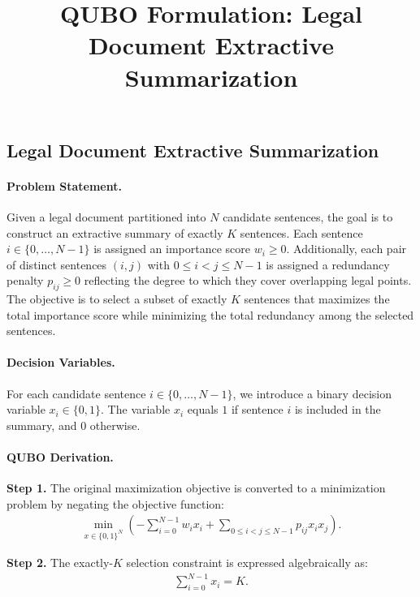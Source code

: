\documentclass[12pt]{article}
\title{QUBO Formulation: Legal Document Extractive Summarization}
\date{}
\begin{document}
\maketitle

\subsection*{Legal Document Extractive Summarization}

\paragraph{Problem Statement.}
Given a legal document partitioned into $N$ candidate sentences, the goal is to construct an extractive summary of exactly $K$ sentences. Each sentence $i \in \{0, \dots, N-1\}$ is assigned an importance score $w_i \geq 0$. Additionally, each pair of distinct sentences $(i, j)$ with $0 \leq i < j \leq N-1$ is assigned a redundancy penalty $p_{ij} \geq 0$ reflecting the degree to which they cover overlapping legal points. The objective is to select a subset of exactly $K$ sentences that maximizes the total importance score while minimizing the total redundancy among the selected sentences.

\paragraph{Decision Variables.}
For each candidate sentence $i \in \{0, \dots, N-1\}$, we introduce a binary decision variable $x_i \in \{0, 1\}$. The variable $x_i$ equals $1$ if sentence $i$ is included in the summary, and $0$ otherwise.

\paragraph{QUBO Derivation.}
\textbf{Step 1.} The original maximization objective is converted to a minimization problem by negating the objective function:
\begin{align}
    \min_{x \in \{0,1\}^N} \left( -\sum_{i=0}^{N-1} w_i x_i + \sum_{0 \leq i < j \leq N-1} p_{ij} x_i x_j \right).
\end{align}

\textbf{Step 2.} The exactly-$K$ selection constraint is expressed algebraically as:
\begin{align}
    \sum_{i=0}^{N-1} x_i = K.
\end{align}
\end{document}
